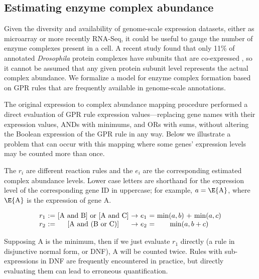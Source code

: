 \subsection{Estimating enzyme complex abundance}

Given the diversity and availability of genome-scale expression datasets,
either as microarray or more recently RNA-Seq, it could be useful to
gauge the number of enzyme complexes present in a cell. A recent
study found that only 11\% of annotated \textit{Drosophila}
protein complexes have subunits that are co-expressed
\citep{Juschke2013}, so it cannot be assumed that any given protein
subunit level represents the actual complex abundance. We formalize a
model for enzyme complex formation based on GPR rules that are
frequently available in genome-scale annotations.

The original expression to complex abundance mapping procedure \citep{Lee2012}
performed a direct evaluation of GPR rule expression
values---replacing gene names with their expression values, ANDs with
minimums, and ORs with sums, without altering the Boolean expression
of the GPR rule in any way. Below we illustrate a 
problem that can occur with this mapping where some genes' expression
levels may be counted more than once. 

The $r_i$ are different reaction rules and the $e_i$ are the
corresponding estimated complex abundance levels. Lower case letters
are shorthand for the expression level of the corresponding gene ID in
uppercase; for example, $a = \E{\textnormal{A}}$, where
$\E{\textnormal{A}}$ is the expression of gene A.

\begin{equation}
\centering
{\setlength{\tabcolsep}{.16667em}
\begin{tabular}{cccccccc}
$r_1$ & := & [A and B] or [A and C] & $\rightarrow$ & $e_1$  &=& $\min(a,b$) + $\min(a,c$) \\ 
$r_2$ & := & [A and (B or C)]       & $\rightarrow$ & $e_2$  &=&  $\min(a, b + c$) 
\end{tabular} 
}
\end{equation}

Supposing A is the minimum, then if we just evaluate $r_1$ directly (a
rule in disjunctive normal form, or DNF), A will be counted twice.
Rules with sub-expressions in DNF are frequently encountered in practice,
but directly evaluating them can lead to erroneous quantification.

